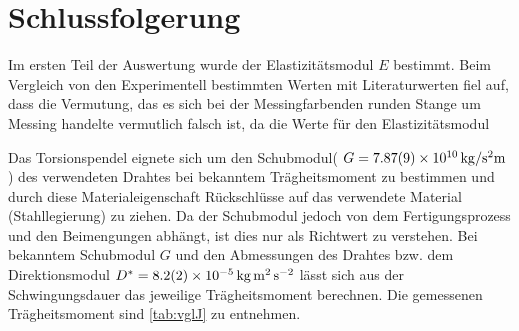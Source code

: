 
\section{Schlussfolgerung}
Im ersten Teil der Auswertung wurde der Elastizitätsmodul $E$ bestimmt. Beim Vergleich von den Experimentell bestimmten Werten mit Literaturwerten fiel auf, dass die Vermutung, das es sich bei der Messingfarbenden runden Stange um Messing handelte vermutlich falsch ist, da die Werte für den Elastizitätsmodul 
























Das Torsionspendel eignete sich um den Schubmodul( $G =\SI{7.87+-0.09e10}{kg \per \second \squared  \metre}$) des verwendeten Drahtes bei bekanntem Trägheitsmoment zu bestimmen und durch diese Materialeigenschaft Rückschlüsse auf das verwendete Material (Stahllegierung) zu ziehen. Da der Schubmodul jedoch von dem Fertigungsprozess und den Beimengungen abhängt, ist dies nur als Richtwert zu verstehen. Bei bekanntem Schubmodul $G$ und den Abmessungen des Drahtes bzw. dem Direktionsmodul $D^*=\SI{8.2+-0.2e-5}{\kilogram \metre \squared \per \second \squared }$  lässt sich aus der Schwingungsdauer das jeweilige Trägheitsmoment berechnen.  Die gemessenen  Trägheitsmoment  sind \cref{tab:vglJ} zu entnehmen.








